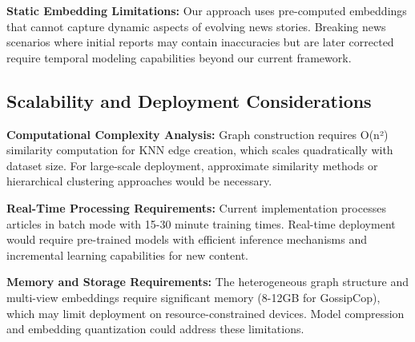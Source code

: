 \textbf{Static Embedding Limitations:} Our approach uses pre-computed embeddings that cannot capture dynamic aspects of evolving news stories. Breaking news scenarios where initial reports may contain inaccuracies but are later corrected require temporal modeling capabilities beyond our current framework.

\subsection{Scalability and Deployment Considerations}

\textbf{Computational Complexity Analysis:} Graph construction requires O(n²) similarity computation for KNN edge creation, which scales quadratically with dataset size. For large-scale deployment, approximate similarity methods or hierarchical clustering approaches would be necessary.

\textbf{Real-Time Processing Requirements:} Current implementation processes articles in batch mode with 15-30 minute training times. Real-time deployment would require pre-trained models with efficient inference mechanisms and incremental learning capabilities for new content.

\textbf{Memory and Storage Requirements:} The heterogeneous graph structure and multi-view embeddings require significant memory (8-12GB for GossipCop), which may limit deployment on resource-constrained devices. Model compression and embedding quantization could address these limitations.

\EndChapter
